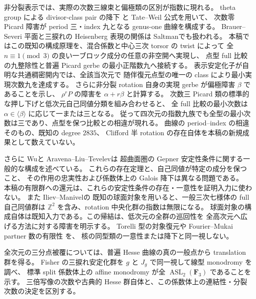 \documentclass[11pt,a4paper]{ltjsarticle}
\numberwithin{equation}{section}
\begin{document}
非分裂表示では、実際の次数三線束と偏極類の区別が指数に現れる。
theta group による divisor-class pair の降下
\cite[Proposition~2.2, Lemma~2.4]{NFMCremonaFisherDescentAlgebra}と
Tate--Weil 公式\cite[Theorem~3.7]{NFMCiperianiKrashen}を用いて、
次数零 Picard 障害が period 三・index 九となる genus-one 曲線を構成する。
Brauer--Severi 平面と三捩れの Heisenberg 表現の関係は
Saltman\cite[Sections~3--4, Theorem~5]{NFMSaltmanSeveri}でも扱われる。
本稿ではこの既知の構成原理を、混合係数と中心三次 torsor の twist によって
全 $n\equiv1\pmod3$ の良い一ブロック成分の任意の非空開へ実現し、
点型 full 比較の九整除性と普遍 Picard gerbe の最小正階数九へ接続する。
表示安定化子が自明な共通稠密開内では、全該当次元で
随伴復元点型の唯一の class により最小実現次数九を達成する。
さらに非分裂 rotation 自身の実現 gerbe が偏極障害 $\beta$ であることを示し、
$\rho^rP$ の障害を $\alpha+r\beta$ と計算する。
次数三 Picard 類の標準的な押し下げと低次元自己同値分類を組み合わせると、
全 full 比較の最小次数は $\alpha\in\langle\beta\rangle$ に応じて一または三となる。
従って四次元の指数九族でも全型の最小次数は三であり、点型を保つ比較との相違が現れる。
曲線の period--index の相違そのもの、既知の degree $2835$、
Clifford 半 rotation の存在自体を本稿の新規成果として数えていない。

さらに Wu\cite[Theorems~1.1, 1.3, Proposition~7.2]{NFMWuStability}と
Aravena--Liu--Tevelev\cite[Theorem~1.2]{NFMAravenaLiuTevelevGepner}は
超曲面圏の Gepner 安定性条件に関する一般的な構成を述べている。
これらの存在定理と、自己同値が特定の成分を保つこと、
その作用の忠実性および係数体上の Galois 降下は異なる問題である。
本稿の有限群への還元は、これらの安定性条件の存在・一意性を証明入力に使わない。
また Iliev--Manivel\cite[Proposition~3.1, Corollary~5.3]{NFMIlievManivelSevenfold}の
既知の球面対象を用いると、一般三次七様体の full 自己同値群は
$\mathbb Z^2$ を含み、rotation 中央化群の指数は無限になる。
球面対象の構成自体は既知入力である。この帰結は、低次元の全群の巡回性を
全高次元へ広げる方法に対する障害を明示する。
Torelli 型の対象復元や Fourier--Mukai partner 数の有限性
\cite{NFPirozhkov,NFMLinRennemoZhangWeighted,NFMLinZengZhangSingularity,NFMLinZhangPartners}を、
核の同型類の一意性または降下と同一視しない。

全次元の三分点被覆については、普遍 Hesse 曲線の真の一般点から translation 群を得る。
Fisher の三捩れ安定化群を $g$ と $J_g$ で同一視して線型 monodromy を調べ、
標準 split 係数体上の affine monodromy が全 $\operatorname{ASL}_2(\mathbf F_3)$ であることを示す。
三倍写像の次数や古典的 Hesse 群自体と、この係数体上の連結性・分裂次数の決定を区別する。
\end{document}
